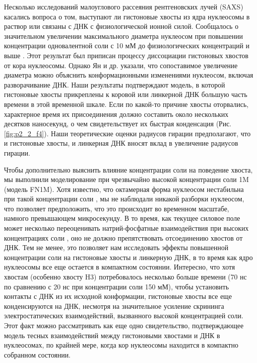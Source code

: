     Несколько исследований малоуглового рассеяния рентгеновских лучей (SAXS) касались вопроса о том, выступают ли гистоновые хвосты из ядра нуклеосомы в раствор или связаны с ДНК с физиологической ионной силой. Сообщалось о значительном увеличении максимального диаметра нуклеосом при повышении концентрации одновалентной соли с 10 мМ до физиологических концентраций и выше \cite{mangenot_salt-induced_2002}. Этот результат был приписан процессу диссоциации гистоновых хвостов от кора нуклеосомы. Однако Ян и др. \cite{yang_biophysical_2011} указали, что сопоставимое увеличение диаметра можно объяснить конформационными изменениями нуклеосом, включая разворачивание ДНК. Наши результаты подтверждают модель, в которой гистоновые хвосты прикреплены к коровой или линкерной ДНК большую часть времени в этой временной шкале. Если по какой-то причине хвосты оторвались, характерное время их присоединения должно составить около нескольких десятков наносекунд, о чем свидетельствует их быстрая конденсация (Рис. \ref{fig:p2_2_f4}). Наши теоретические оценки радиусов гирации предполагают, что и гистоновые хвосты, и линкерная ДНК вносят вклад в увеличение радиусов гирации.

    Чтобы дополнительно выяснить влияние концентрации соли на поведение хвоста, мы выполнили моделирование при чрезвычайно высокой концентрации соли 1M (модель FN1M). Хотя известно, что октамерная форма нуклеосом нестабильна при такой концентрации соли \cite{wilhelm_reconstitution_1978}, мы не наблюдали никакой разборки нуклеосом, что позволяет предположить, что это происходит во временном масштабе, намного превышающем микросекунду. В то время, как текущее силовое поле может несколько переоценивать натрий-фосфатные взаимодействия при высоких концентрациях соли \cite{yoo_improved_2012}, оно не должно препятствовать отсоединению хвостов от ДНК. Тем не менее, это позволяет нам исследовать эффекты повышенной концентрации соли на гистоновые хвосты и линкерную ДНК, в то время как ядро нуклеосомы все еще остается в компактном состоянии. Интересно, что хотя хвостам (особенно хвосту H3) потребовалось несколько больше времени (70 нс по сравнению с 20 нс при концентрации соли 150 мМ), чтобы установить контакты с ДНК из их исходной конформации, гистоновые хвосты все еще конденсируются на ДНК, несмотря на значительное усиление скрининга электростатических взаимодействий, вызванного высокой концентрацией соли. Этот факт можно рассматривать как еще одно свидетельство, подтверждающее модель тесных взаимодействий между гистоновыми хвостами и ДНК в нуклеосомах, по крайней мере, когда кор нуклеосомы находится в компактно собранном состоянии.

